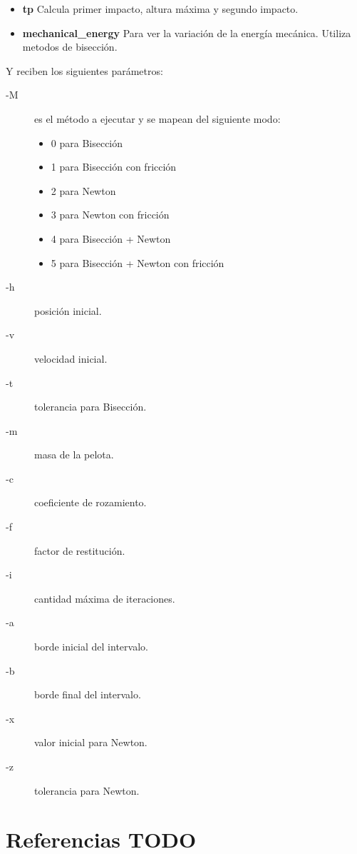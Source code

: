 \documentclass[a4paper]{article}
\begin{document}
\begin{itemize}
  \item \textbf{tp} Calcula primer impacto, altura máxima y segundo impacto.
  \item \textbf{mechanical\_energy} Para ver la variación de la energía mecánica. Utiliza metodos de bisección.
\end{itemize}

Y reciben los siguientes parámetros:

\begin{description}
\item[-M] es el método a ejecutar y se mapean del siguiente modo:
\begin{itemize}
  \item 0 para Bisección
  \item 1 para Bisección con fricción
  \item 2 para Newton
  \item 3 para Newton con fricción
  \item 4 para Bisección + Newton
  \item 5 para Bisección + Newton con fricción
\end{itemize}
\item[-h] posición inicial.
\item[-v] velocidad inicial.
\item[-t] tolerancia para Bisección.
\item[-m] masa de la pelota.
\item[-c] coeficiente de rozamiento.
\item[-f] factor de restitución.
\item[-i] cantidad máxima de iteraciones.
\item[-a] borde inicial del intervalo.
\item[-b] borde final del intervalo.
\item[-x] valor inicial para Newton.
\item[-z] tolerancia para Newton.
\end{description}

\newpage

\section{Referencias TODO}
\end{document}
